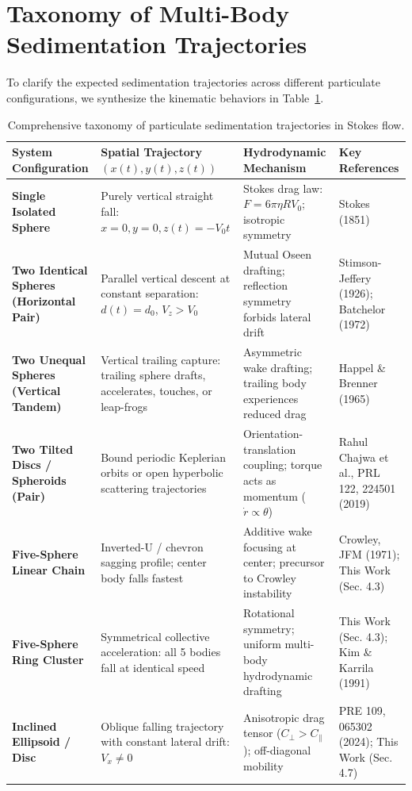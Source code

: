 \documentclass[11pt,a4paper]{article}
\begin{document}
\section{Taxonomy of Multi-Body Sedimentation Trajectories}

To clarify the expected sedimentation trajectories across different particulate configurations, we synthesize the kinematic behaviors in Table~\ref{tab:trajectory_taxonomy}.

\begin{table}[htbp]
\centering
\caption{Comprehensive taxonomy of particulate sedimentation trajectories in Stokes flow.}
\label{tab:trajectory_taxonomy}
\begin{tabular}{p{3.2cm}p{4.0cm}p{4.5cm}p{3.5cm}}
\toprule
\textbf{System Configuration} & \textbf{Spatial Trajectory $(x(t), y(t), z(t))$} & \textbf{Hydrodynamic Mechanism} & \textbf{Key References} \\
\midrule
\textbf{Single Isolated Sphere} & Purely vertical straight fall: $x=0, y=0, z(t) = -V_0 t$ & Stokes drag law: $F = 6\pi\eta R V_0$; isotropic symmetry & Stokes (1851) \\
\midrule
\textbf{Two Identical Spheres (Horizontal Pair)} & Parallel vertical descent at constant separation: $d(t) = d_0$, $V_z > V_0$ & Mutual Oseen drafting; reflection symmetry forbids lateral drift & Stimson-Jeffery (1926); Batchelor (1972) \\
\midrule
\textbf{Two Unequal Spheres (Vertical Tandem)} & Vertical trailing capture: trailing sphere drafts, accelerates, touches, or leap-frogs & Asymmetric wake drafting; trailing body experiences reduced drag & Happel \& Brenner (1965) \\
\midrule
\textbf{Two Tilted Discs / Spheroids (Pair)} & Bound periodic Keplerian orbits or open hyperbolic scattering trajectories & Orientation-translation coupling; torque acts as momentum ($\dot{r} \propto \theta$) & Rahul Chajwa et al., PRL 122, 224501 (2019) \\
\midrule
\textbf{Five-Sphere Linear Chain} & Inverted-U / chevron sagging profile; center body falls fastest & Additive wake focusing at center; precursor to Crowley instability & Crowley, JFM (1971); This Work (Sec. 4.3) \\
\midrule
\textbf{Five-Sphere Ring Cluster} & Symmetrical collective acceleration: all 5 bodies fall at identical speed & Rotational symmetry; uniform multi-body hydrodynamic drafting & This Work (Sec. 4.3); Kim \& Karrila (1991) \\
\midrule
\textbf{Inclined Ellipsoid / Disc} & Oblique falling trajectory with constant lateral drift: $V_x \ne 0$ & Anisotropic drag tensor ($C_\perp > C_\parallel$); off-diagonal mobility & PRE 109, 065302 (2024); This Work (Sec. 4.7) \\
\bottomrule
\end{tabular}
\end{table}
\end{document}
